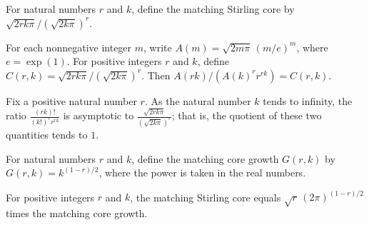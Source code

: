 \begin{definition}
\label{FABL.matchingStirlingCore}
\leanok
For natural numbers $r$ and $k$, define the matching Stirling core by
$\sqrt{2rk\pi}/(\sqrt{2k\pi})^r$.
\end{definition}

\begin{theorem}
\label{FABL.factorialStirlingApprox_matching_ratio_eq_core}
\leanok
{}
For each nonnegative integer $m$, write $A(m)=\sqrt{2m\pi}\,(m/e)^m$, where $e=\exp(1)$.
For positive integers $r$ and $k$, define $C(r,k)=\sqrt{2rk\pi}/(\sqrt{2k\pi})^r$. Then
$A(rk)/(A(k)^r r^{rk})=C(r,k)$.
\end{theorem}

\begin{theorem}
\label{FABL.matchingFactorialRatio_isEquivalent_core}
\leanok
{}
Fix a positive natural number $r$. As the natural number $k$ tends to infinity, the
ratio $\frac{(rk)!}{(k!)^r r^{rk}}$ is asymptotic to
$\frac{\sqrt{2rk\pi}}{(\sqrt{2k\pi})^r}$; that is, the quotient of these two
quantities tends to $1$.
\end{theorem}

\begin{definition}
\label{FABL.matchingCoreGrowth}
\leanok
For natural numbers $r$ and $k$, define the matching core growth $G(r,k)$ by
$G(r,k)=k^{(1-r)/2}$, where the power is taken in the real numbers.
\end{definition}

\begin{theorem}
\label{FABL.matchingStirlingCore_eq_constant_mul_growth}
\leanok
{}
For positive integers $r$ and $k$, the matching Stirling core equals $\sqrt
r\,(2\pi)^{(1-r)/2}$ times the matching core growth.
\end{theorem}

